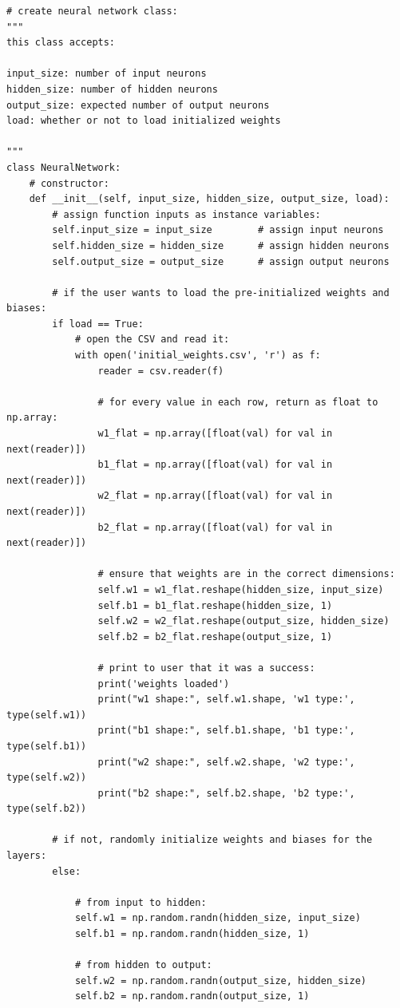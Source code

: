 \documentclass[a4paper]{article}
\begin{document}
\begin{lstlisting}
# create neural network class:
"""
this class accepts:

input_size: number of input neurons
hidden_size: number of hidden neurons
output_size: expected number of output neurons
load: whether or not to load initialized weights

"""
class NeuralNetwork:
    # constructor:
    def __init__(self, input_size, hidden_size, output_size, load):
        # assign function inputs as instance variables:
        self.input_size = input_size        # assign input neurons
        self.hidden_size = hidden_size      # assign hidden neurons
        self.output_size = output_size      # assign output neurons

        # if the user wants to load the pre-initialized weights and biases:
        if load == True:
            # open the CSV and read it:
            with open('initial_weights.csv', 'r') as f:
                reader = csv.reader(f)

                # for every value in each row, return as float to np.array:
                w1_flat = np.array([float(val) for val in next(reader)])
                b1_flat = np.array([float(val) for val in next(reader)])
                w2_flat = np.array([float(val) for val in next(reader)])
                b2_flat = np.array([float(val) for val in next(reader)])

                # ensure that weights are in the correct dimensions:
                self.w1 = w1_flat.reshape(hidden_size, input_size)
                self.b1 = b1_flat.reshape(hidden_size, 1)
                self.w2 = w2_flat.reshape(output_size, hidden_size)
                self.b2 = b2_flat.reshape(output_size, 1)

                # print to user that it was a success:
                print('weights loaded')
                print("w1 shape:", self.w1.shape, 'w1 type:', type(self.w1))
                print("b1 shape:", self.b1.shape, 'b1 type:', type(self.b1))
                print("w2 shape:", self.w2.shape, 'w2 type:', type(self.w2))
                print("b2 shape:", self.b2.shape, 'b2 type:', type(self.b2))

        # if not, randomly initialize weights and biases for the layers:
        else:

            # from input to hidden:
            self.w1 = np.random.randn(hidden_size, input_size)
            self.b1 = np.random.randn(hidden_size, 1)

            # from hidden to output:
            self.w2 = np.random.randn(output_size, hidden_size)
            self.b2 = np.random.randn(output_size, 1)


\end{lstlisting}
\end{document}
